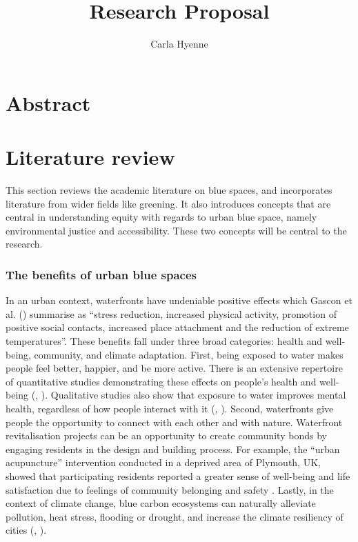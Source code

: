 \documentclass{article}
\title{Research Proposal}
\author{Carla Hyenne}
\date{}
\begin{document}
\maketitle

\tableofcontents 


\section{Abstract}



\pagebreak
\section{Literature review}

This section reviews the academic literature on blue spaces, and incorporates literature from wider fields like greening. It also introduces concepts that are central in understanding equity with regards to urban blue space, namely environmental justice and accessibility. These two concepts will be central to the research.

\subsubsection{The benefits of urban blue spaces}

In an urban context, waterfronts have undeniable positive effects which Gascon et al. (\citeyear{gascon2017outdoor}) summarise as ``stress reduction, increased physical activity, promotion of positive social contacts, increased place attachment and the reduction of extreme temperatures''. These benefits fall under three broad categories: health and well-being, community, and climate adaptation.
First, being exposed to water makes people feel better, happier, and be more active. There is an extensive repertoire of quantitative studies demonstrating these effects on people's health and well-being (\cite{gascon2017outdoor}, \cite{britton2020blue}).
Qualitative studies also show that exposure to water improves mental health, regardless of how people interact with it (\cite{garrett2019urban}, \cite{van2021urban}).
Second, waterfronts give people the opportunity to connect with each other and with nature. Waterfront revitalisation projects can be an opportunity to create community bonds by engaging residents in the design and building process. For example, the ``urban acupuncture'' intervention conducted in a deprived area of Plymouth, UK, showed that participating residents reported a greater sense of well-being and life satisfaction due to feelings of community belonging and safety \parencite{van2021urban}.
Lastly, in the context of climate change, blue carbon ecosystems can naturally alleviate pollution, heat stress, flooding or drought, and increase the climate resiliency of cities (\cite{lin2020water}, \cite{o2021international}). 
\end{document}
